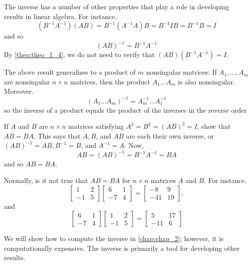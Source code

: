 \documentclass[../main.tex]{subfiles}
\begin{document}
The inverse has a number of other properties that play a role in developing results in linear algebra. For instance,
$$
\left(B^{-1} A^{-1}\right)(A B)=B^{-1}\left(A^{-1} A\right) B=B^{-1} I B=B^{-1} B=I
$$
and so
$$
(A B)^{-1}=B^{-1} A^{-1}
$$
By \autoref{theo:theo_1_4}, we do not need to verify that $(A B)\left(B^{-1} A^{-1}\right)=I$.

\begin{remark}
	The above result generalizes to a product of $m$ nonsingular matrices: If $A_{1}, \ldots, A_{m}$ are nonsingular $n \times n$ matrices, then the product $A_{1} \ldots A_{m}$ is also nonsingular. Moreover.
	$$
	\left(A_{1} \ldots A_{m}\right)^{-1}=A_{m}^{-1} \ldots A_{1}^{-1}
	$$
	so the inverse of a product equals the product of the inverses in the reverse order
\end{remark}


\begin{example} If $A$ and $B$ are $n \times n$ matrices satisfying $A^{2}=B^{2}=(A B)^{2}=I$, show that $A B=B A .$
This says that $A, B$, and $A B$ are each their own inverse, or $(A B)^{-1}=A B, B^{-1}=B$, and $A^{-1}=A .$ Now,
$$
A B=(A B)^{-1}=B^{-1} A^{-1}=B A
$$
and so $A B=B A$.
\end{example}

Normally, is it not true that $A B=B A$ for $n \times n$ matrices $A$ and $B .$ For instance.
$$
\left[\begin{array}{cc}
1 & 2 \\
-1 & 5
\end{array}\right]\left[\begin{array}{cc}
6 & 1 \\
-7 & 4
\end{array}\right]=\left[\begin{array}{cc}
-8 & 9 \\
-41 & 19
\end{array}\right],
$$
and
$$
\left[\begin{array}{cc}
6 & 1 \\
-7 & 4
\end{array}\right]\left[\begin{array}{cc}
1 & 2 \\
-1 & 5
\end{array}\right]=\left[\begin{array}{cc}
5 & 17 \\
-11 & 6
\end{array}\right]
$$

\begin{remark}
	We will show how to compute the inverse in \autoref{chap:chap_2}; however, it is computationally expensive. The inverse is primarily a tool for developing other results.
\end{remark}
\end{document}

